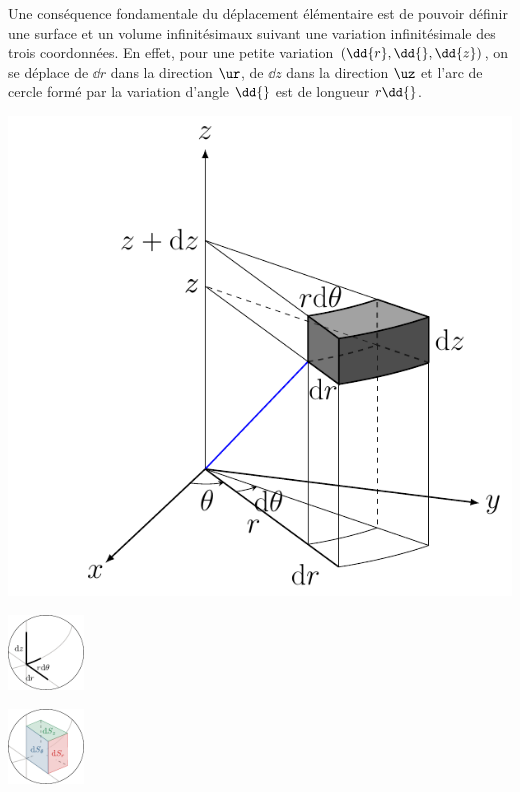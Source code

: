 \documentclass[../../main/main.tex]{subfiles}
\begin{document}
\noindent
\begin{minipage}{0.48\linewidth}
  Une conséquence fondamentale du déplacement élémentaire est de pouvoir définir
  une surface et un volume infinitésimaux suivant une variation infinitésimale
  des trois coordonnées.
  \smallbreak
  En effet, pour une petite variation $(\dd{r}, \dd{\tt}, \dd{z})$,
  on se déplace de $\dd{r}$ dans la direction $\ur$, de $\dd{z}$ dans la
  direction $\uz$ et l'arc de cercle formé par la variation d'angle $\dd{\tt}$
  est de longueur $r\dd{\tt}$.
\end{minipage}
\hfill
\begin{minipage}{0.25\linewidth}
	\begin{center}
		\includegraphics[width=\linewidth]{cyl_vol}
    \captionsetup{justification=centering}
	\end{center}
\end{minipage}
\begin{minipage}{0.25\linewidth}
	\begin{center}
		\includegraphics[height=2cm]{zoom_cyl_lgn}
	\end{center}
	\begin{center}
		\includegraphics[height=2cm]{zoom_cyl_sfc}
    \captionsetup{justification=centering}
	\end{center}
\end{minipage}
\end{document}
